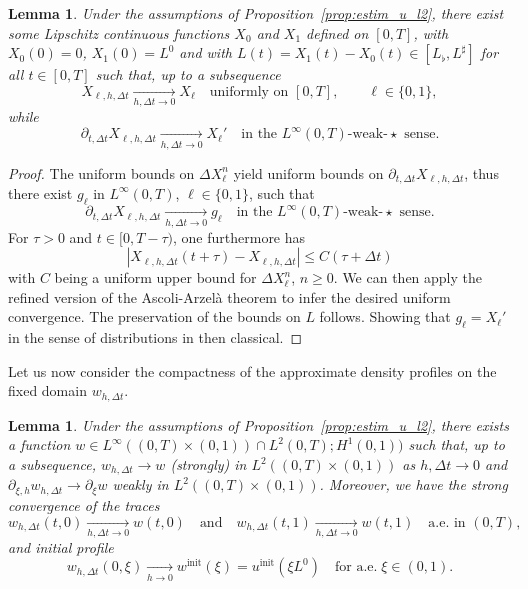 \documentclass{amsart}
\newcommand\dt{\Delta t}
\newcommand\p{\partial}
\newtheorem{lemma}[theorem]{Lemma}
\begin{document}
	\begin{lemma} \label{lem:compact.X}
	Under the assumptions of Proposition~\ref{prop:estim_u_l2}, there exist some Lipschitz continuous functions $X_0$ and $X_1$ defined on $[0,T]$, 
	with $X_0(0) = 0$, $X_1(0) = L^0$ and with $L(t) = X_1(t) - X_0(t) \in [L_\flat, L^\sharp]$ for all $t \in [0,T]$ 
	such that, up to a subsequence
	\begin{equation}\label{eq:X.Lip}
	X_{\ell, h, \dt} \underset{h,\dt \to 0}\longrightarrow X_\ell \quad \text{uniformly on $[0,T]$}, \qquad \ell \in \{0,1\}, 
	\end{equation}
	while 
	\begin{equation}\label{eq:X.Lip.2}
	\p_{t, \dt} X_{\ell,h,\dt}  \underset{h,\dt \to 0}\longrightarrow X_\ell' \quad \text{in the $L^\infty(0,T)$-weak-$\star$ sense}.
	\end{equation}
	\end{lemma}
	\begin{proof}
	The uniform bounds on $\Delta X_\ell^n$ yield uniform bounds on $\p_{t, \dt} X_{\ell,h,\dt}$, thus there exist $g_\ell$ in $L^\infty(0,T)$, $\ell \in \{0,1\}$, 
	such that 
	\[
	\p_{t, \dt} X_{\ell,h,\dt}  \underset{h,\dt \to 0}\longrightarrow g_\ell \quad \text{in the $L^\infty(0,T)$-weak-$\star$ sense}.
	\]
	For $\tau>0$ and $t \in [0,T-\tau)$, one furthermore has
	\[
	|X_{\ell,h,\dt}(t+\tau) - X_{\ell, h, \dt}| \leq C(\tau+\dt)
	\]
	with $C$ being a uniform upper bound for $\Delta X^n_\ell$, $n \geq 0$. 
	We can then apply the refined version of the Ascoli-Arzelà theorem \cite[Proposition 3.3.1]{AGS08} to infer the desired uniform convergence. 
	The preservation of the bounds on $L$ follows. 
	Showing that $g_\ell = X_\ell'$ in the sense of distributions in then classical. 
	\end{proof}
	
Let us now consider the compactness of the approximate density profiles on the fixed domain $w_{h,\Delta t}$.
	
		\begin{lemma} \label{lem:aubsim}
			Under the assumptions of Proposition~\ref{prop:estim_u_l2}, there exists a function $w \in L^\infty((0,T)\times(0,1)) \cap L^2(0,T);H^1(0,1))$ such that, up to a subsequence, $w_{h,\dt} \longrightarrow w$ (strongly) in $L^2((0,T)\times(0,1))$ as $h,\dt \rightarrow 0$ and $\partial_{\xi,h} w_{h,\dt} \longrightarrow \partial_\xi w$ weakly in $L^2((0,T)\times(0,1))$. Moreover, we have the strong convergence of the traces 
			\begin{equation}\label{eq:conv.traces}
			w_{h,\dt}(t, 0) \underset{h,\dt \to 0} \longrightarrow w(t,0) \quad \text{and} \quad  w_{h,\dt}(t, 1) \underset{h,\dt \to 0} \longrightarrow w(t,1) \quad 
			\text{a.e. in } (0,T), 
			\end{equation}
			and initial profile
			\begin{equation}\label{eq:conv.init}
			w_{h,\dt}(0, \xi) \underset{h \to 0} \longrightarrow w^\text{init}(\xi) = u^\text{init}(\xi L^0)\quad
			\text{for a.e.}\; \xi \in (0,1). 
			\end{equation}
		\end{lemma}
\end{document}
